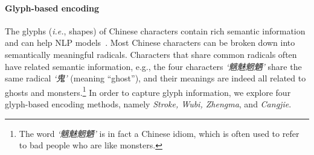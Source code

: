 
 
\paragraph{Glyph-based encoding}
The glyphs (\textit{i.e.}, shapes) of Chinese characters contain rich semantic information and can help NLP models~\cite{cw2vec}.  Most Chinese characters can be broken down into semantically meaningful radicals. Characters that share common radicals often have related semantic information, e.g., the four characters \textit{`魑魅魍魉'} share the same radical \textit{`鬼'} (meaning ``ghost''), and their meanings are indeed all related to ghosts and monsters.\footnote{The word \textit{`魑魅魍魉'} is in fact a Chinese idiom, which is often used to refer to bad people who are like monsters.} 
%
In order to capture glyph information, we explore four glyph-based encoding methods, namely \textit{Stroke, Wubi, Zhengma}, and \textit{Cangjie}.





